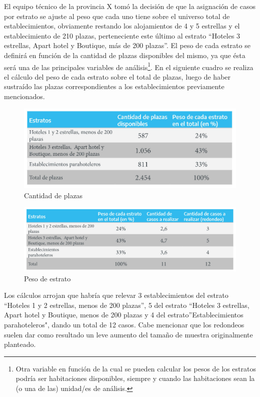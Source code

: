 \documentclass[
]{book}
\begin{document}
El equipo técnico de la provincia X tomó la decisión de que la asignación de casos por estrato se ajuste al peso que cada uno tiene sobre el universo total de establecimientos, obviamente restando los alojamientos de 4 y 5 estrellas y el establecimiento de 210 plazas, perteneciente este último al estrato ``Hoteles 3 estrellas, Apart hotel y Boutique, más de 200 plazas''. El peso de cada estrato se definirá en función de la cantidad de plazas disponibles del mismo, ya que ésta será una de las principales variables de análisis\footnote{Otra variable en función de la cual se pueden calcular los pesos de los estratos podría ser habitaciones disponibles, siempre y cuando las habitaciones sean la (o una de las) unidad/es de análisis.}. En el siguiente cuadro se realiza el cálculo del peso de cada estrato sobre el total de plazas, luego de haber sustraído las plazas correspondientes a los establecimientos previamente mencionados.

\begin{figure}

{\centering \includegraphics[width=0.8\linewidth]{imagenes/tabla_2A} 

}

\caption{Cantidad de plazas}\label{fig:cantidad-de-plazas}
\end{figure}

\begin{figure}

{\centering \includegraphics[width=0.8\linewidth]{imagenes/tabla_2B} 

}

\caption{Peso de estrato}\label{fig:peso-de-estrato}
\end{figure}

Los cálculos arrojan que habría que relevar 3 establecimientos del estrato ``Hoteles 1 y 2 estrellas, menos de 200 plazas'', 5 del estrato ``Hoteles 3 estrellas, Apart hotel y Boutique, menos de 200 plazas y 4 del estrato''Establecimientos parahoteleros", dando un total de 12 casos. Cabe mencionar que los redondeos suelen dar como resultado un leve aumento del tamaño de muestra originalmente planteado.
\end{document}
